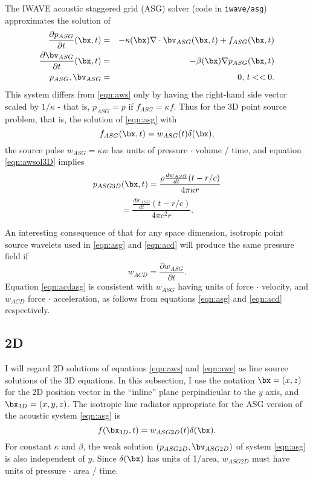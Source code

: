 The IWAVE acoustic staggered grid (ASG) solver (code in {\tt iwave/asg}) approximates the solution of
\begin{eqnarray}
\label{eqn:asg}
\frac{\partial p_{ASG}}{\partial t}(\bx,t) & = &-\kappa(\bx) \nabla \cdot \bv_{ASG}(\bx,t) + f_{ASG}(\bx,t)\nonumber\\
\frac{\partial \bv_{ASG}}{\partial t}(\bx,t) & = & -\beta(\bx) \nabla p_{ASG}(\bx,t)\nonumber\\
p_{ASG}, \bv_{ASG} &=& 0,\, t << 0.
\end{eqnarray}
This system differs from \ref{eqn:aws} only by having the right-hand side vector scaled by $1/\kappa$ - that is, $p_{ASG} = p$ if $f_{ASG} = \kappa f$. Thus for the 3D point source problem, that is, the solution of \ref{eqn:asg} with 
\[
f_{ASG}(\bx,t) = w_{ASG}(t) \delta(\bx),
\]
the source pulse $w_{ASG}=\kappa w$ has units of pressure $\cdot$ volume / time, and equation \ref{eqn:awsol3D} implies
\[
p_{ASG3D}(\bx,t) = \frac{\rho\frac{dw_{ASG}}{dt}(t-r/c)}{4\pi \kappa r}
\]
\begin{equation}
\label{eqn:asgsol3d}
= \frac{\frac{dw_{ASG}}{dt}(t-r/c)}{4\pi c^2 r}.
\end{equation}

An interesting consequence of that for any space dimension, isotropic point source wavelets used in \ref{eqn:asg} and \ref{eqn:acd} will produce the same pressure field if 
\begin{equation}
\label{eqn:acdasg}
w_{ACD} = \frac{\partial w_{ASG}}{\partial t}.
\end{equation}
Equation \ref{eqn:acdasg} is consistent with $w_{ASG}$ having units of force $\cdot$ velocity, and $w_{ACD}$ force $\cdot$ acceleration, as follows from equations \ref{eqn:asg} and \ref{eqn:acd} respectively.

\subsection{2D}
I will regard 2D solutions of equations \ref{eqn:aws} and
\ref{eqn:awe} as line source solutions of the 3D equations. In this
subsection, I use the notation $\bx=(x,z)$ for the 2D position vector
in the ``inline'' plane perpindicular to the $y$ axis, and $\bx_{3D} =
(x,y,z)$. The isotropic line radiator appropriate for the ASG version
of the acoustic system
\ref{eqn:asg} is 
\begin{equation}
\label{eqn:ilr}
f(\bx_{3D},t) = w_{ASG2D}(t)\delta(\bx).
\end{equation}
For constant $\kappa$ and $\beta$, the weak solution $(p_{ASG2D}, \bv_{ASG2D})$ of system \ref{eqn:asg} is also independent of $y$. Since $\delta(\bx)$ has units of 1/area, $w_{ASG2D}$ must have units of pressure $\cdot$ area / time. 
 
